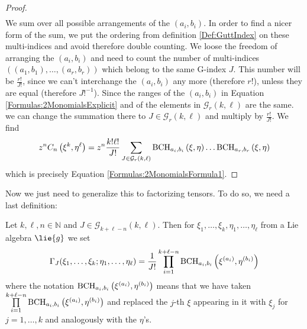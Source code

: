 \begin{proof}
\begin{align}
    \end{align}
    We sum over all possible arrangements of the $(a_i, b_i)$. In order 
    to find a nicer form of the sum, we put the ordering from definition 
    \ref{Def:GuttIndex} on these multi-indices and avoid therefore double 
    counting. We loose the freedom of arranging the $(a_i, b_i)$ and 
    need to count the number of multi-indices $((a_1, b_1), \ldots, 
    (a_r, b_r))$ which belong to the same G-index $J$. This number will 
    be $\frac{r!}{J!}$, since we can't interchange the $(a_i, b_i)$ any 
    more (therefore $r!$), unless they are equal (therefore $J!^{-1}$). 
    Since the ranges of the $(a_i, b_i)$ in Equation 
    \eqref{Formulas:2MonomialsExplicit} and of  the elements in 
    $\mathcal{G}_r(k, \ell)$ are the same. we can change the summation there 
    to $J \in \mathcal{G}_r(k, \ell)$ and multiply by $\frac{r!}{J!}$. We 
    find
    \begin{equation*}
    	z^n C_n \left( \xi^k, \eta^{\ell} \right)
    	=
    	z^n \frac{k! \ell!}{J!}
    	\sum\limits_{J \in \mathcal{G}_r(k, \ell)}
    	\mathrm{BCH}_{a_i, b_i}\left(\xi, \eta\right)
        \ldots
        \mathrm{BCH}_{a_r, b_r}\left(\xi, \eta\right)
    \end{equation*}
    which is precisely Equation \eqref{Formulas:2MonomialsFormula1}.
\end{proof}
Now we just need to generalize this to factorizing tensors. To do so, we 
need a last definition:
\begin{definition}
	\label{Def:GuttInsert}
	Let $k, \ell, n \in \mathbb{N}$ and $J \in \mathcal{G}_{k + \ell - 
	n}(k, \ell)$. Then for $\xi_1, \ldots, \xi_k, \eta_1, \ldots, 
	\eta_{\ell}$ from a Lie algebra $\lie{g}$ we set
	\begin{equation}
		\label{Formulas:GuttInsert}
		\Gamma_J(\xi_1, \ldots, \xi_k; \eta_1, \ldots, \eta_{\ell})
		=
		\frac{1}{J!}
		\prod\limits_{i=1}^{k + \ell - n}
		\mathrm{BCH}_{a_i, b_i}\left(\xi^{(a_i)}, \eta^{(b_i)}\right)
	\end{equation}
	where the notation $\mathrm{BCH}_{a_i, b_i}\left(\xi^{(a_i)}, \eta^{(b_i)}\right)$ 
	means that we have taken $\prod\limits_{i=1}^{k + \ell - n} 
	\mathrm{BCH}_{a_i, b_i}\left(\xi^{(a_i)}, \eta^{(b_i)}\right)$ and replaced the 
	$j$-th $\xi$ appearing in it with $\xi_j$ for $j = 1, \ldots, k$ and 
	analogously with the $\eta$'s.
\end{definition}
